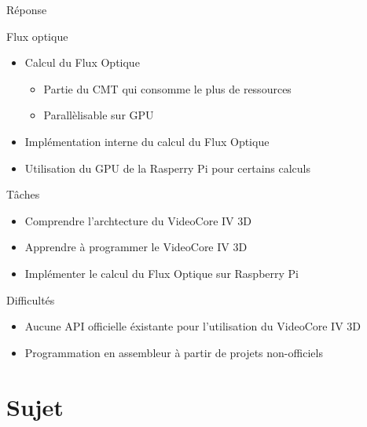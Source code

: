 \documentclass{bredelebeamer}
\begin{document}
\begin{frame}{Réponse}
\begin{block}{Flux optique}
\begin{itemize}
\item Calcul du Flux Optique
\begin{itemize}
	\item Partie du CMT qui consomme le plus de ressources
	\item Parallèlisable sur GPU
\end{itemize}
\item Implémentation interne du calcul du Flux Optique
\item Utilisation du GPU de la Rasperry Pi pour certains calculs
\end{itemize}
\end{block}

\begin{exampleblock}{Tâches}
\begin{itemize}
\item Comprendre l'archtecture du VideoCore IV 3D
\item Apprendre à programmer le VideoCore IV 3D
\item Implémenter le calcul du Flux Optique sur Raspberry Pi
\end{itemize}
\end{exampleblock}

\begin{alertblock}{Difficultés}
\begin{itemize}
\item Aucune API officielle éxistante pour l'utilisation du VideoCore IV 3D
\item Programmation en assembleur à partir de projets non-officiels
\end{itemize}
\end{alertblock}

\end{frame}





\section{Sujet}

\end{document}
